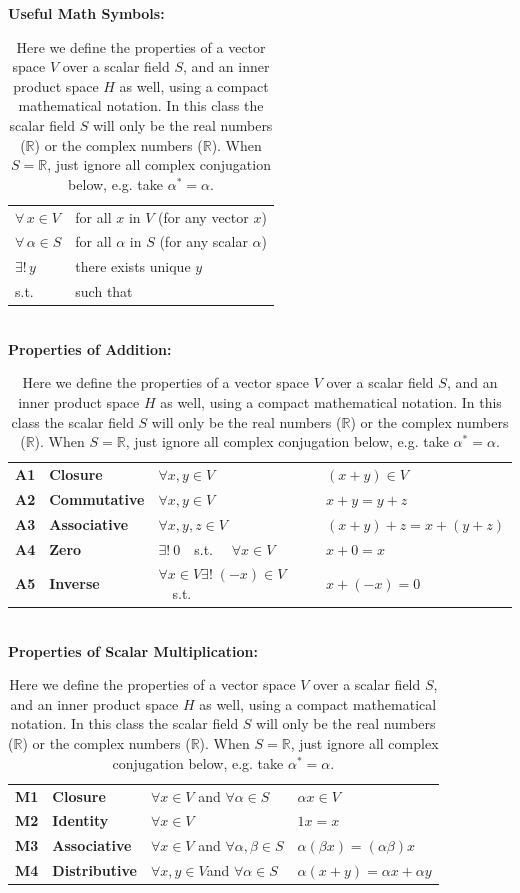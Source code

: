 \documentclass[12pt]{book}
\begin{document}
\begin{table}
\caption{ \label{tbl:ipspace} Here we define the properties of a vector space $V$ over a scalar field $S$, and an inner product space $H$ as well, using a compact mathematical notation.  In this class the scalar field $S$ will only be the real numbers ($\mathbb{R}$) or the complex numbers ($\mathbb{R}$).
When $S=\mathbb{R}$, just ignore all complex conjugation below, e.g. take $\alpha^* = \alpha$.}
\begin{center}
{\bf Useful Math Symbols:}\\
\begin{tabular}{ll}
  $\forall \, x \in V$ & for all $x$ in $V$ (for any vector $x$)\\
  $\forall \, \alpha \in S$ & for all $\alpha$ in $S$ (for any scalar $\alpha$) \\
  $\exists ! \, y$ & there exists unique $y$ \\
  s.t.          & such that \\
\end{tabular}\\    
\vskip 0.5cm
{\bf Properties of Addition:}\\
\begin{tabular}{llll}
{\bf A1} & {\bf Closure} & $\forall x,y \in V$ & $(x+y) \in V $\\
{\bf A2} & {\bf Commutative} & $\forall x,y \in V$ & $x+y=y+z$\\
{\bf A3} & {\bf Associative} & $\forall x,y,z \in V$ & $(x+y)+z = x+(y+z)$\\
{\bf A4} & {\bf Zero}        & $\exists !~0$~~s.t.~~ $\forall x \in V$ & $x+0 = x$ \\
{\bf A5} & {\bf Inverse} & $\forall x \in V \exists !\;(-x) \in V$~~s.t.~~& $x+(-x)=0$\\
\end{tabular} \\
\vskip 0.5cm
{\bf Properties of Scalar Multiplication:}\\
\begin{tabular}{llll}
  {\bf M1} & {\bf Closure} & $\forall x \in V$ and $\forall \alpha \in S$ & $\alpha x \in V$\\
  {\bf M2} & {\bf Identity} & $\forall x \in V$ & $1x=x$\\
  {\bf M3} & {\bf Associative} & $\forall x \in V$
and $\forall \alpha,\beta \in S$ & $\alpha(\beta x) = (\alpha \beta) x$\\
{\bf M4} & {\bf Distributive} & $\forall x,y \in V$and $\forall \alpha \in S$ & $\alpha(x+y) = \alpha x + \alpha y$ \\

\end{tabular}
\end{center}
\end{table}
\end{document}
